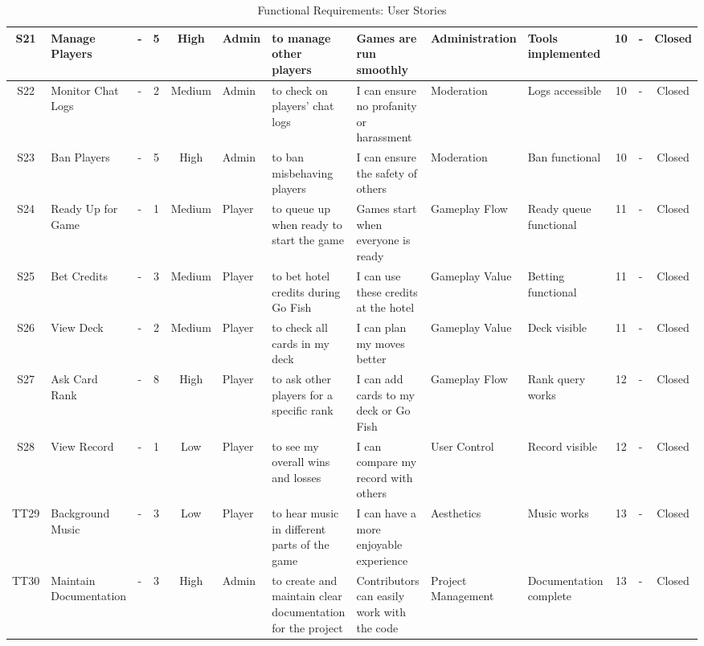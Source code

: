 \begin{table}[h]
{\begin{tabular}{|c|p{2.5cm}|c|c|c|p{3cm}|p{3cm}|p{3cm}|p{3cm}|p{2.5cm}|c|p{2.5cm}|c|}
S21 & Manage Players & - & 5 & High & Admin & to manage other players & Games are run smoothly & Administration & Tools implemented & 10 & - & Closed \\ \hline
S22 & Monitor Chat Logs & - & 2 & Medium & Admin & to check on players' chat logs & I can ensure no profanity or harassment & Moderation & Logs accessible & 10 & - & Closed \\ \hline
S23 & Ban Players & - & 5 & High & Admin & to ban misbehaving players & I can ensure the safety of others & Moderation & Ban functional & 10 & - & Closed \\ \hline
S24 & Ready Up for Game & - & 1 & Medium & Player & to queue up when ready to start the game & Games start when everyone is ready & Gameplay Flow & Ready queue functional & 11 & - & Closed \\ \hline
S25 & Bet Credits & - & 3 & Medium & Player & to bet hotel credits during Go Fish & I can use these credits at the hotel & Gameplay Value & Betting functional & 11 & - & Closed \\ \hline
S26 & View Deck & - & 2 & Medium & Player & to check all cards in my deck & I can plan my moves better & Gameplay Value & Deck visible & 11 & - & Closed \\ \hline
S27 & Ask Card Rank & - & 8 & High & Player & to ask other players for a specific rank & I can add cards to my deck or Go Fish & Gameplay Flow & Rank query works & 12 & - & Closed \\ \hline
S28 & View Record & - & 1 & Low & Player & to see my overall wins and losses & I can compare my record with others & User Control & Record visible & 12 & - & Closed \\ \hline
TT29 & Background Music & - & 3 & Low & Player & to hear music in different parts of the game & I can have a more enjoyable experience & Aesthetics & Music works & 13 & - & Closed \\ \hline
TT30 & Maintain Documentation & - & 3 & High & Admin & to create and maintain clear documentation for the project & Contributors can easily work with the code & Project Management & Documentation complete & 13 & - & Closed \\ \hline
\end{tabular}
}
\caption{Functional Requirements: User Stories}
\label{tab:functional_user_stories}
\end{table}